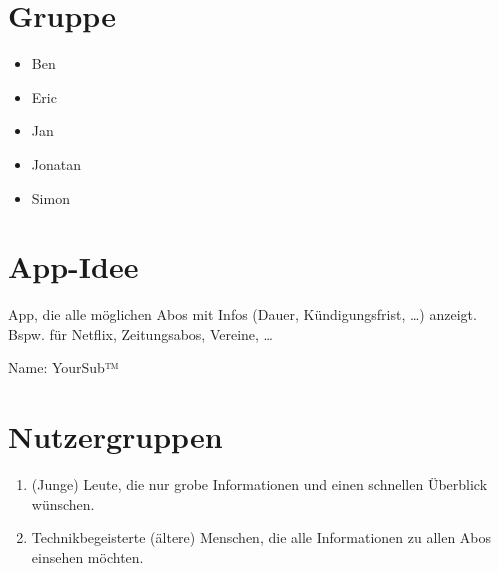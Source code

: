 \documentclass{scrartcl}
\begin{document}

\section{Gruppe}
\begin{itemize}
\item Ben
\item Eric
\item Jan
\item Jonatan
\item Simon
\end{itemize}

\section{App-Idee}
App, die alle möglichen Abos mit Infos (Dauer, Kündigungsfrist, …) anzeigt. Bspw. für Netflix, Zeitungsabos, Vereine, …\

Name: YourSub™

\section{Nutzergruppen}
\begin{enumerate}
\item (Junge) Leute, die nur grobe Informationen und einen schnellen Überblick wünschen.
\item Technikbegeisterte (ältere) Menschen, die alle Informationen zu allen Abos einsehen möchten.
\end{enumerate}
\end{document}
